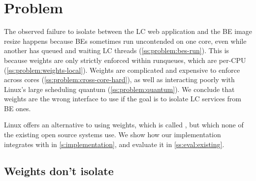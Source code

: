 \section{Problem}\label{s:problem}

The observed failure to isolate between the LC web application and the BE image
resize happens because BEs sometimes run uncontended on one core, even while
another has queued and waiting LC threads (\autoref{ss:problem:bes-run}). This
is because weights are only strictly enforced within runqueues, which are
per-CPU (\autoref{ss:problem:weights-local}). Weights are complicated and
expensive to enforce across cores (\autoref{ss:problem:cross-core-hard}), as
well as interacting poorly with Linux's large scheduling quantum
(\autoref{ss:problem:quantum}). We conclude that weights are the wrong interface
to use if the goal is to isolate LC services from BE ones.

Linux offers an alternative to using \cgroups{} weights, which is called
\schedidle{}, but which none of the existing open source systems use. We show
how our implementation integrates with \schedidle{} in
\autoref{s:implementation}, and evaluate it in \autoref{ss:eval:existing}.


\subsection{Weights don't isolate}\label{ss:problem:bes-run}


